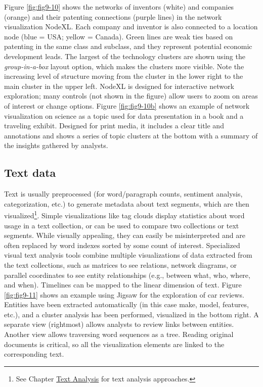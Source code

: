 \documentclass[]{krantz}
\begin{document}
Figure \ref{fig:fig9-10} shows the networks of inventors (white) and
companies (orange) and their patenting connections (purple lines) in the
network visualization NodeXL. Each company and inventor is also
connected to a location node (blue = USA; yellow = Canada). Green lines
are weak ties based on patenting in the same class and subclass, and
they represent potential economic development leads. The largest of the
technology clusters are shown using the \emph{group-in-a-box} layout
option, which makes the clusters more visible. Note the increasing level
of structure moving from the cluster in the lower right to the main
cluster in the upper left. NodeXL is designed for interactive network
exploration; many controls (not shown in the figure) allow users to zoom
on areas of interest or change options. Figure \ref{fig:fig9-10b} shows
an example of network visualization on science as a topic used for data
presentation in a book and a traveling exhibit. Designed for print
media, it includes a clear title and annotations and shows a series of
topic clusters at the bottom with a summary of the insights gathered by
analysts.

\subsection{Text data}\label{sec:viz-2.7}

Text is usually preprocessed (for word/paragraph counts, sentiment
analysis, categorization, etc.) to generate metadata about text
segments, which are then visualized\footnote{See Chapter
  \protect\hyperlink{chap:text}{Text Analysis} for text analysis
  approaches.}. Simple visualizations like tag clouds display statistics
about word usage in a text collection, or can be used to compare two
collections or text segments. While visually appealing, they can easily
be misinterpreted and are often replaced by word indexes sorted by some
count of interest. Specialized visual text analysis tools combine
multiple visualizations of data extracted from the text collections,
such as matrices to see relations, network diagrams, or parallel
coordinates to see entity relationships (e.g., between what, who, where,
and when). Timelines can be mapped to the linear dimension of text.
Figure \ref{fig:fig9-11} shows an example using Jigsaw
\citep{stasko2008jigsaw} for the exploration of car reviews. Entities
have been extracted automatically (in this case make, model, features,
etc.), and a cluster analysis has been performed, visualized in the
bottom right. A separate view (rightmost) allows analysts to review
links between entities. Another view allows traversing word sequences as
a tree. Reading original documents is critical, so all the visualization
elements are linked to the corresponding text.
\end{document}
